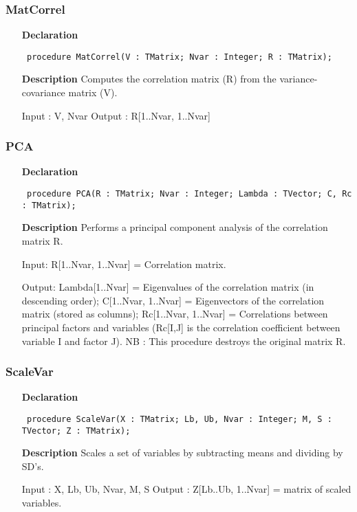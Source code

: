 \documentclass[12pt,a4paper,oneside]{report}
\newcommand{\declarationitem}[1]{\textbf{#1}}
\newcommand{\descriptiontitle}[1]{\textbf{#1}}
\newcommand{\code}[1]{\texttt{#1}}
\begin{document}
\subsubsection{MatCorrel}
\label{upca-MatCorrel}
\begin{itemize}\item[\declarationitem{Declaration}\hfill]
	\begin{flushleft}
		\code{
			procedure MatCorrel(V : TMatrix; Nvar : Integer; R : TMatrix);}
	\end{flushleft}
	\item[\descriptiontitle{Description}]
	Computes the correlation matrix (R) from the variance{-}covariance matrix (V).
	
	Input : V, Nvar Output : R[1..Nvar, 1..Nvar]
\end{itemize}
\subsubsection{PCA}
\label{upca-PCA}
\begin{itemize}\item[\declarationitem{Declaration}\hfill]
	\begin{flushleft}
		\code{
			procedure PCA(R : TMatrix; Nvar : Integer; Lambda : TVector; C, Rc : TMatrix);}
	\end{flushleft}
	\item[\descriptiontitle{Description}]
	Performs a principal component analysis of the correlation matrix R.
	
	Input: R[1..Nvar, 1..Nvar] = Correlation matrix. 
	
	Output: Lambda[1..Nvar] = Eigenvalues of the correlation matrix (in descending order); C[1..Nvar, 1..Nvar] = Eigenvectors of the correlation matrix (stored as columns); Rc[1..Nvar, 1..Nvar] = Correlations between principal factors and variables (Rc[I,J] is the correlation coefficient between variable I and factor J). NB : This procedure destroys the original matrix R.
	
\end{itemize}
\subsubsection{ScaleVar}
\label{upca-ScaleVar}
\begin{itemize}\item[\declarationitem{Declaration}\hfill]
	\begin{flushleft}
		\code{
			procedure ScaleVar(X : TMatrix; Lb, Ub, Nvar : Integer; M, S : TVector; Z : TMatrix);}
	\end{flushleft}
	\item[\descriptiontitle{Description}]
	Scales a set of variables by subtracting means and dividing by SD's.
	
	Input : X, Lb, Ub, Nvar, M, S Output : Z[Lb..Ub, 1..Nvar] = matrix of scaled variables.
	
\end{itemize}
\end{document}
